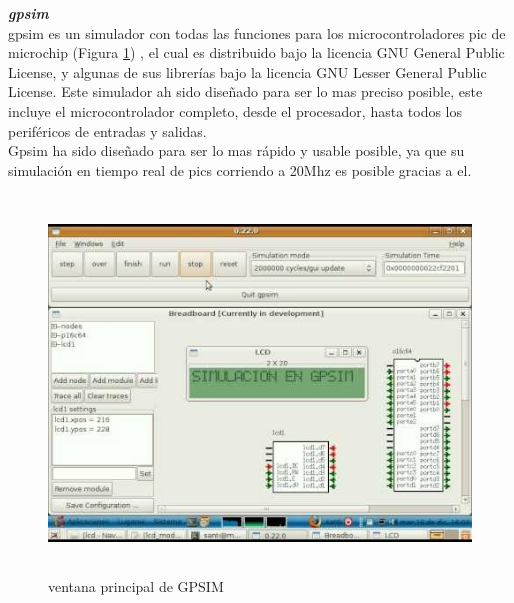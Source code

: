 \documentclass[12pt,a4paper]{article}
\begin{document}
   \textbf{\textit{gpsim}}  \\
   gpsim es un simulador con todas las funciones para los microcontroladores pic de microchip (Figura \ref{fig:gpsim}) , el cual es distribuido bajo la licencia GNU General Public License, y algunas de sus librerías bajo la licencia GNU Lesser General Public License. Este simulador ah sido diseñado para ser lo mas preciso posible, este incluye el microcontrolador completo, desde el procesador, hasta todos los periféricos de entradas y salidas. \\
   Gpsim ha sido diseñado para ser lo mas rápido y usable posible, ya que su simulación en tiempo real de pics corriendo a 20Mhz es posible gracias a el. \\
   
   \begin{figure}[htpb]
   \centering
   \includegraphics[height=10cm]{gpsim}
   \caption{ventana principal de GPSIM}
   \label{fig:gpsim}
   \end{figure}
   
\end{document}
